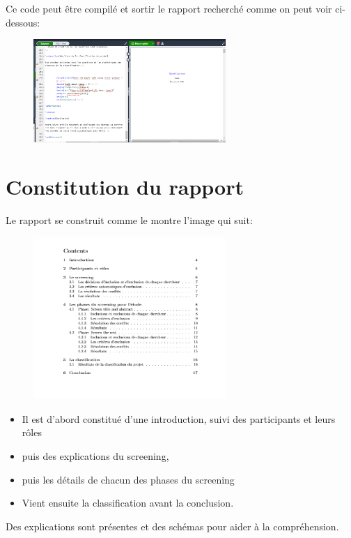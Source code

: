Ce code peut être compilé et sortir le rapport recherché comme on peut voir ci-dessous:

\begin{figure}[H]
        \centering
        \includegraphics[width=0.65\textwidth]{resources/images/exemple5.PNG}
\end{figure}
\newpage
\section{Constitution du rapport}

Le rapport se construit comme le montre l'image qui suit:

\begin{figure}[H]
        \centering
        \includegraphics[width=0.65\textwidth]{resources/images/rapport.PNG}
\end{figure}
\vspace*{4mm}
\begin{itemize}
    \item Il est d'abord constitué d'une introduction, suivi des participants et leurs rôles
    \item puis des explications du screening,
    \item  puis les détails de chacun des phases du screening
    \item Vient ensuite la classification avant la conclusion.
\end{itemize}
Des explications sont présentes et des schémas pour aider à la compréhension.
\newpage
